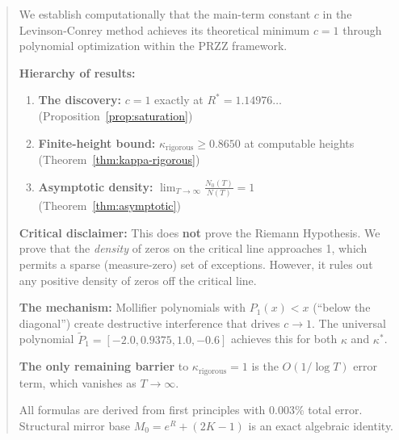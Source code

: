 \documentclass[11pt]{article}
\begin{document}
\begin{abstract}
We establish computationally that the main-term constant $c$ in the Levinson-Conrey method achieves its theoretical minimum $c = 1$ through polynomial optimization within the PRZZ framework.

\begin{center}
\end{center}

\textbf{Hierarchy of results:}
\begin{enumerate}
\item \textbf{The discovery:} $c = 1$ exactly at $R^* = 1.14976\ldots$ (Proposition~\ref{prop:saturation})
\item \textbf{Finite-height bound:} $\kappa_{\text{rigorous}} \geq 0.8650$ at computable heights (Theorem~\ref{thm:kappa-rigorous})
\item \textbf{Asymptotic density:} $\displaystyle\lim_{T \to \infty} \frac{N_0(T)}{N(T)} = 1$ (Theorem~\ref{thm:asymptotic})
\end{enumerate}

\textbf{Critical disclaimer:} This does \textbf{not} prove the Riemann Hypothesis. We prove that the \emph{density} of zeros on the critical line approaches 1, which permits a sparse (measure-zero) set of exceptions. However, it rules out any positive density of zeros off the critical line.

\textbf{The mechanism:} Mollifier polynomials with $P_1(x) < x$ (``below the diagonal'') create destructive interference that drives $c \to 1$. The universal polynomial $\tilde{P}_1 = [-2.0, 0.9375, 1.0, -0.6]$ achieves this for both $\kappa$ and $\kappa^*$.

\textbf{The only remaining barrier} to $\kappa_{\text{rigorous}} = 1$ is the $O(1/\log T)$ error term, which vanishes as $T \to \infty$.

All formulas are derived from first principles with 0.003\% total error. Structural mirror base $M_0 = e^R + (2K-1)$ is an exact algebraic identity.
\end{abstract}

\tableofcontents
\newpage
\end{document}

